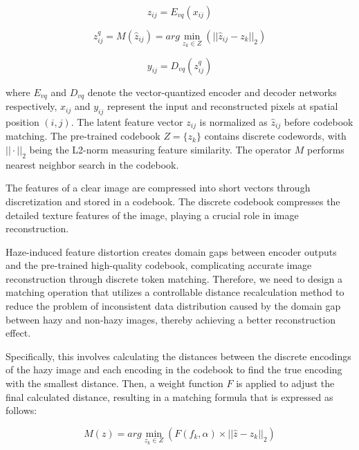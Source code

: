 \documentclass[journal]{IEEEtran}
\begin{document}
\begin{equation}
	\label{vq_equation_1}
	z_{ij} = E_{vq}(x_{ij})
\end{equation}

\begin{equation}
	\label{vq_equation_2}
	z_{ij}^{q} = M(\widehat{z}_{ij}) = arg \min_{z_{k} \in Z} (|| \widehat{z}_{ij} - z_{k} ||_{2})
\end{equation}

\begin{equation}
	\label{vq_equation_3}
	y_{ij} = D_{vq}(z_{ij}^{q})
\end{equation}

\noindent where $E_{vq}$ and $D_{vq}$ denote the vector-quantized encoder and decoder networks respectively, $x_{ij}$ and $y_{ij}$ represent the input and reconstructed pixels at spatial position $(i,j)$. The latent feature vector $z_{ij}$ is normalized as $\widehat{z}_{ij}$ before codebook matching. The pre-trained codebook $Z = \{z_{k}\}$ contains discrete codewords, with $||\cdot||_{2}$ being the L2-norm measuring feature similarity. The operator $M$ performs nearest neighbor search in the codebook.

The features of a clear image are compressed into short vectors through discretization and stored in a codebook. The discrete codebook compresses the detailed texture features of the image, playing a crucial role in image reconstruction.

Haze-induced feature distortion creates domain gaps between encoder outputs and the pre-trained high-quality codebook, complicating accurate image reconstruction through discrete token matching. Therefore, we need to design a matching operation that utilizes a controllable distance recalculation method to reduce the problem of inconsistent data distribution caused by the domain gap between hazy and non-hazy images, thereby achieving a better reconstruction effect.

Specifically, this involves calculating the distances between the discrete encodings of the hazy image and each encoding in the codebook to find the true encoding with the smallest distance. Then, a weight function $F$ is applied to adjust the final calculated distance, resulting in a matching formula that is expressed as follows:

\begin{equation}
	\label{codebook_matching_equation_2}
	M(z) = arg \min_{z_{k} \in Z} (F(f_{k}, \alpha) \times || \widehat{z} - z_{k} ||_{2})
\end{equation}
\end{document}
